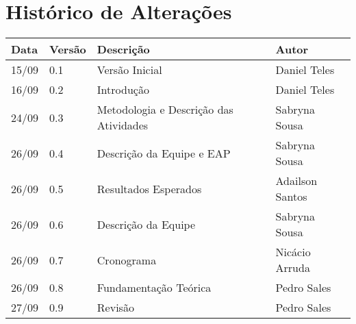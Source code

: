 \chapter*{Histórico de Alterações}

\begin{table}[!htbp]
\centering
\label{my-label}
\begin{tabular}{|l|l|l|l|}
\hline
\textbf{Data} & \textbf{Versão} & \textbf{Descrição} & \textbf{Autor} \\ \hline
15/09         & 0.1             & Versão Inicial     & Daniel Teles   \\ \hline
16/09         & 0.2             & Introdução         & Daniel Teles   \\ \hline
24/09         & 0.3             & Metodologia e Descrição das Atividades       & Sabryna Sousa  \\ \hline
26/09         & 0.4             & Descrição da Equipe e EAP       & Sabryna Sousa  \\ \hline
26/09         & 0.5             & Resultados Esperados       & Adailson Santos  \\ \hline
26/09         & 0.6             & Descrição da Equipe       & Sabryna Sousa  \\ \hline
26/09         & 0.7             & Cronograma       & Nicácio Arruda  \\ \hline
26/09         & 0.8             & Fundamentação Teórica     & Pedro Sales\\ \hline
27/09         & 0.9             & Revisão     & Pedro Sales\\ \hline

\end{tabular}
\end{table}

\cleardoublepage
